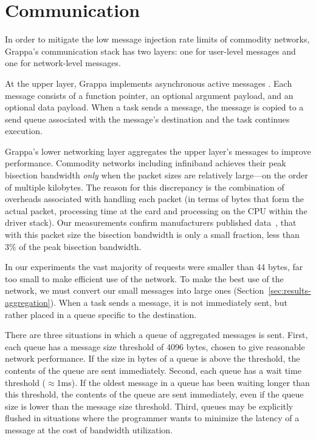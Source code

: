 \section{Communication}\label{sec:communication}

In order to mitigate the low message injection rate limits of commodity
networks, Grappa's communication stack has two layers: one for
user-level messages and one for network-level messages. 

At the upper layer, Grappa implements asynchronous active messages
\cite{vonEicken92}. Each message consists of a function pointer, an
optional argument payload, and an optional data payload. When a task
sends a message, the message is copied to a send queue associated with
the message's destination and the task continues execution.

Grappa's lower networking layer aggregates the upper layer's messages
to improve performance. Commodity networks including infiniband
achieves their peak bisection bandwidth \emph{only} when the packet
sizes are relatively large---on the order of multiple kilobytes. The
reason for this discrepancy is the combination of overheads associated
with handling each packet (in terms of bytes that form the actual
packet, processing time at the card and processing on the
CPU within the driver stack). Our measurements confirm manufacturers
published data~\cite{infinibandbandwidth}, that with this packet size
the bisection bandwidth is only a small fraction, less than
3\% of the peak bisection bandwidth.

In our experiments the vast majority of requests were smaller than
44 bytes, far too small to make
efficient use of the network. To make the best use of the network, we
must convert our small messages into large ones
(Section~\ref{sec:results-aggregation}).  When a task sends a message,
it is not immediately sent, but rather placed in a queue specific to the
destination.

There are three situations in which a queue of aggregated messages is
sent. First, each queue has a message size threshold of 4096 bytes, chosen to give reasonable network performance. If the size in
bytes of a queue is above the threshold, the contents of the queue are
sent immediately. Second, each queue has a wait time threshold
($\approx${1ms}). If the oldest message in a queue has been waiting
longer than this threshold, the contents of the queue are sent
immediately, even if the queue size is lower than the message size
threshold.  Third, queues may be explicitly flushed in situations where
the programmer wants to minimize the latency of a message at the cost of
bandwidth utilization.

